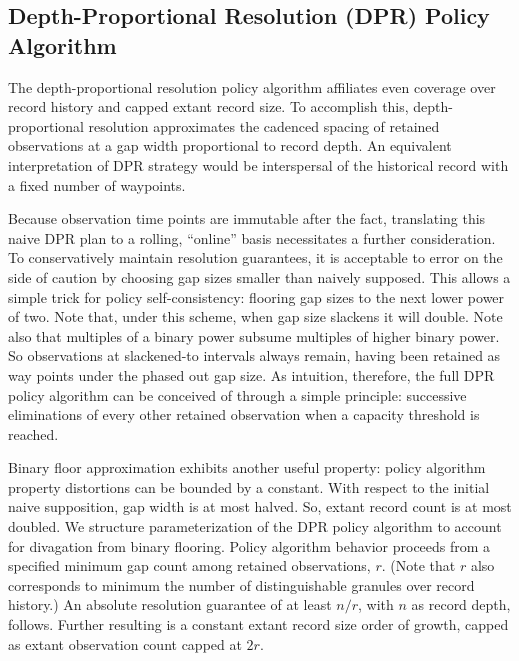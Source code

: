 \subsection{Depth-Proportional Resolution (DPR) Policy Algorithm}
\label{sec:depth-proportional-resolution-algo}

The depth-proportional resolution policy algorithm affiliates even coverage over record history and capped extant record size.
To accomplish this, depth-proportional resolution approximates the cadenced spacing of retained observations at a gap width proportional to record depth.
An equivalent interpretation of DPR strategy would be interspersal of the historical record with a fixed number of waypoints.

Because observation time points are immutable after the fact, translating this naive DPR plan to a rolling, ``online'' basis necessitates a further consideration.
To conservatively maintain resolution guarantees, it is acceptable to error on the side of caution by choosing gap sizes smaller than naively supposed.
This allows a simple trick for policy self-consistency: flooring gap sizes to the next lower power of two.
Note that, under this scheme, when gap size slackens it will double.
Note also that multiples of a binary power subsume multiples of higher binary power.
So observations at slackened-to intervals always remain, having been retained as way points under the phased out gap size.
As intuition, therefore, the full DPR policy algorithm can be conceived of through a simple principle: successive eliminations of every other retained observation when a capacity threshold is reached.

Binary floor approximation exhibits another useful property: policy algorithm property distortions can be bounded by a constant.
With respect to the initial naive supposition, gap width is at most halved.
So, extant record count is at most doubled.
We structure parameterization of the DPR policy algorithm to account for divagation from binary flooring.
Policy algorithm behavior proceeds from a specified minimum gap count among retained observations, $r$.
(Note that $r$ also corresponds to minimum the number of distinguishable granules over record history.)
An absolute resolution guarantee of at least $n/r$, with $n$ as record depth, follows.
Further resulting is a constant extant record size order of growth, capped as extant observation count capped at $2r$.






